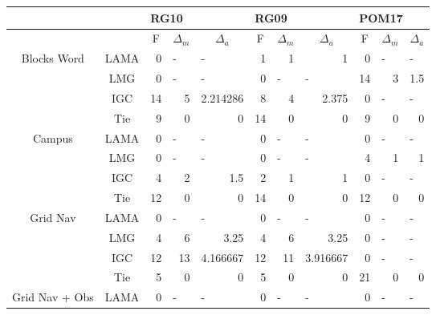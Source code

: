 \documentclass{article}
\begin{document}
\begin{table}[htbp]
\begin{tabular}{|c|c|r|r|r|r|r|r|r|r|r|}
\hline
&&\multicolumn{3}{|l|}{RG10}&\multicolumn{3}{|l|}{RG09}&\multicolumn{3}{|l|}{POM17} \\ \hline
&\multicolumn{1}{|l|}{} & \multicolumn{1}{c|}{F} & \multicolumn{1}{c|}{$\Delta_m$} & \multicolumn{1}{c|}{$\Delta_a$} & \multicolumn{1}{c|}{F} & \multicolumn{1}{c|}{$\Delta_m$} & \multicolumn{1}{c|}{$\Delta_a$} & \multicolumn{1}{c|}{F} & \multicolumn{1}{c|}{$\Delta_m$} & \multicolumn{1}{c|}{$\Delta_a$} \\ \hline
\multirow{ 4}{*}{Blocks Word} & LAMA & 0 & \multicolumn{1}{l|}{-} & \multicolumn{1}{l|}{-} & 1 & 1 & 1 & 0 & \multicolumn{1}{l|}{-} & \multicolumn{1}{l|}{-} \\
&LMG & 0 & \multicolumn{1}{l|}{-} & \multicolumn{1}{l|}{-} & 0 & \multicolumn{1}{l|}{-} & \multicolumn{1}{l|}{-} & 14 & 3 & 1.5 \\
&IGC & 14 & 5 & 2.214286 & 8 & 4 & 2.375 & 0 & \multicolumn{1}{l|}{-} & \multicolumn{1}{l|}{-} \\ 
&Tie & 9 & 0 & 0 & 14 & 0 & 0 & 9 & 0 & 0 \\ \hline
\multirow{ 4}{*}{Campus} & LAMA & 0 & \multicolumn{1}{l|}{-} & \multicolumn{1}{l|}{-} & 0 & \multicolumn{1}{l|}{-} & \multicolumn{1}{l|}{-} & 0 & \multicolumn{1}{l|}{-} & \multicolumn{1}{l|}{-} \\
&LMG & 0 & \multicolumn{1}{l|}{-} & \multicolumn{1}{l|}{-} & 0 & \multicolumn{1}{l|}{-} & \multicolumn{1}{l|}{-} & 4 & 1 & 1 \\ 
&IGC & 4 & 2 & 1.5 & 2 & 1 & 1 & 0 & \multicolumn{1}{l|}{-} & \multicolumn{1}{l|}{-} \\
&Tie & 12 & 0 & 0 & 14 & 0 & 0 & 12 & 0 & 0 \\ \hline
\multirow{ 4}{*}{Grid Nav} & LAMA & 0 & \multicolumn{1}{l|}{-} & \multicolumn{1}{l|}{-} & 0 & \multicolumn{1}{l|}{-} & \multicolumn{1}{l|}{-} & 0 & \multicolumn{1}{l|}{-} & \multicolumn{1}{l|}{-} \\
&LMG & 4 & 6 & 3.25 & 4 & 6 & 3.25 & 0 & \multicolumn{1}{l|}{-} & \multicolumn{1}{l|}{-} \\
&IGC & 12 & 13 & 4.166667 & 12 & 11 & 3.916667 & 0 & \multicolumn{1}{l|}{-} & \multicolumn{1}{l|}{-} \\
&Tie & 5 & 0 & 0 & 5 & 0 & 0 & 21 & 0 & 0 \\ \hline
\multirow{ 4}{*}{Grid Nav + Obs} & LAMA & 0 & \multicolumn{1}{l|}{-} & \multicolumn{1}{l|}{-} & 0 & \multicolumn{1}{l|}{-} & \multicolumn{1}{l|}{-} & 0 & \multicolumn{1}{l|}{-} & \multicolumn{1}{l|}{-} \\

\end{tabular}
\end{table}
\end{document}
